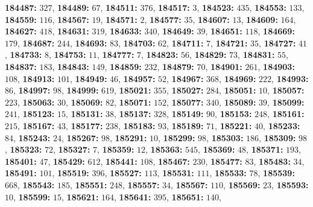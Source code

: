 \textsf{\bfseries 184487:} $327$, \textsf{\bfseries 184489:} $67$, \textsf{\bfseries 184511:} $376$, \textsf{\bfseries 184517:} $3$, \textsf{\bfseries 184523:} $435$, \textsf{\bfseries 184553:} $133$, \textsf{\bfseries 184559:} $116$, \textsf{\bfseries 184567:} $19$, \textsf{\bfseries 184571:} $2$, \textsf{\bfseries 184577:} $35$, \textsf{\bfseries 184607:} $13$, \textsf{\bfseries 184609:} $164$, \textsf{\bfseries 184627:} $418$, \textsf{\bfseries 184631:} $319$, \textsf{\bfseries 184633:} $340$, \textsf{\bfseries 184649:} $39$, \textsf{\bfseries 184651:} $118$, \textsf{\bfseries 184669:} $179$, \textsf{\bfseries 184687:} $244$, \textsf{\bfseries 184693:} $83$, \textsf{\bfseries 184703:} $62$, \textsf{\bfseries 184711:} $7$, \textsf{\bfseries 184721:} $35$, \textsf{\bfseries 184727:} $41$, \textsf{\bfseries 184733:} $8$, \textsf{\bfseries 184753:} $11$, \textsf{\bfseries 184777:} $7$, \textsf{\bfseries 184823:} $56$, \textsf{\bfseries 184829:} $73$, \textsf{\bfseries 184831:} $55$, \textsf{\bfseries 184837:} $183$, \textsf{\bfseries 184843:} $149$, \textsf{\bfseries 184859:} $232$, \textsf{\bfseries 184879:} $70$, \textsf{\bfseries 184901:} $261$, \textsf{\bfseries 184903:} $108$, \textsf{\bfseries 184913:} $101$, \textsf{\bfseries 184949:} $46$, \textsf{\bfseries 184957:} $52$, \textsf{\bfseries 184967:} $368$, \textsf{\bfseries 184969:} $222$, \textsf{\bfseries 184993:} $86$, \textsf{\bfseries 184997:} $98$, \textsf{\bfseries 184999:} $619$, \textsf{\bfseries 185021:} $355$, \textsf{\bfseries 185027:} $284$, \textsf{\bfseries 185051:} $10$, \textsf{\bfseries 185057:} $223$, \textsf{\bfseries 185063:} $30$, \textsf{\bfseries 185069:} $82$, \textsf{\bfseries 185071:} $152$, \textsf{\bfseries 185077:} $340$, \textsf{\bfseries 185089:} $39$, \textsf{\bfseries 185099:} $241$, \textsf{\bfseries 185123:} $15$, \textsf{\bfseries 185131:} $38$, \textsf{\bfseries 185137:} $328$, \textsf{\bfseries 185149:} $90$, \textsf{\bfseries 185153:} $248$, \textsf{\bfseries 185161:} $215$, \textsf{\bfseries 185167:} $43$, \textsf{\bfseries 185177:} $238$, \textsf{\bfseries 185183:} $93$, \textsf{\bfseries 185189:} $71$, \textsf{\bfseries 185221:} $40$, \textsf{\bfseries 185233:} $84$, \textsf{\bfseries 185243:} $24$, \textsf{\bfseries 185267:} $98$, \textsf{\bfseries 185291:} $10$, \textsf{\bfseries 185299:} $98$, \textsf{\bfseries 185303:} $186$, \textsf{\bfseries 185309:} $98$, \textsf{\bfseries 185323:} $72$, \textsf{\bfseries 185327:} $7$, \textsf{\bfseries 185359:} $12$, \textsf{\bfseries 185363:} $545$, \textsf{\bfseries 185369:} $48$, \textsf{\bfseries 185371:} $193$, \textsf{\bfseries 185401:} $47$, \textsf{\bfseries 185429:} $612$, \textsf{\bfseries 185441:} $108$, \textsf{\bfseries 185467:} $230$, \textsf{\bfseries 185477:} $83$, \textsf{\bfseries 185483:} $34$, \textsf{\bfseries 185491:} $101$, \textsf{\bfseries 185519:} $396$, \textsf{\bfseries 185527:} $113$, \textsf{\bfseries 185531:} $111$, \textsf{\bfseries 185533:} $78$, \textsf{\bfseries 185539:} $668$, \textsf{\bfseries 185543:} $185$, \textsf{\bfseries 185551:} $248$, \textsf{\bfseries 185557:} $34$, \textsf{\bfseries 185567:} $110$, \textsf{\bfseries 185569:} $23$, \textsf{\bfseries 185593:} $10$, \textsf{\bfseries 185599:} $15$, \textsf{\bfseries 185621:} $164$, \textsf{\bfseries 185641:} $395$, \textsf{\bfseries 185651:} $140$, 
